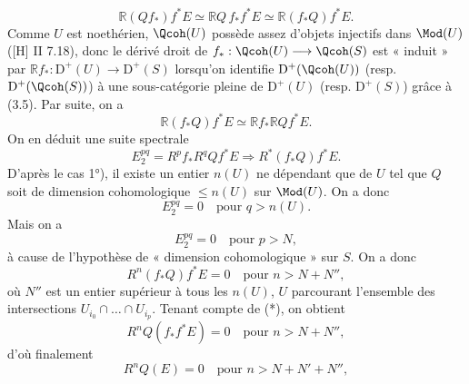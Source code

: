 \begin{equation}\tag{*}
 \mathbb R(Qf_*)f^*E\simeq \mathbb RQ\,f_*f^*E\simeq \mathbb R(f_*Q)f^*E.
\end{equation}
Comme $U$ est noethérien, $\Qcoh(U)$ possède assez d'objets injectifs dans $\Mod(U)$ ([H] II 7.18), donc le dérivé droit de $f_*:\Qcoh(U)\longrightarrow\Qcoh(S)$ est « induit » par $\mathbb Rf_*:\mathrm D^+(U)\longrightarrow\mathrm D^+(S)$ lorsqu'on identifie $\mathrm D^+(\Qcoh(U))$ (resp. $\mathrm D^+(\Qcoh(S))$) à une sous-catégorie pleine de $\mathrm D^+(U)$ (resp. $\mathrm D^+(S)$) grâce à (3.5). Par suite, on a
\[
 \mathbb R(f_*Q)f^*E\simeq \mathbb Rf_*\mathbb RQf^*E.
\]
On en déduit une suite spectrale
\[
 E_2^{pq}=R^pf_*R^qQf^*E\Longrightarrow R^{*}(f_*Q)f^*E.
\]
D'après le cas 1°), il existe un entier $n(U)$ ne dépendant que de $U$ tel que $Q$ soit de dimension cohomologique $\leq n(U)$ sur $\Mod(U)$. On a donc
\[
 E_2^{pq}=0\quad\text{pour }q>n(U).
\]
Mais on a
\[
 E_2^{pq}=0\quad\text{pour }p>N,
\]
à cause de l'hypothèse de « dimension cohomologique » sur $S$. On a donc
\[
 R^n(f_*Q)f^*E=0\quad\text{pour }n>N+N'',
\]
où $N''$ est un entier supérieur à tous les $n(U)$, $U$ parcourant l'ensemble des intersections $U_{i_0}\cap\ldots\cap U_{i_p}$. Tenant compte de (*), on obtient
\[
 R^nQ(f_*f^*E)=0\quad\text{pour }n>N+N'',
\]
d'où finalement
\[
 R^nQ(E)=0\quad\text{pour }n>N+N'+N'',
\]
